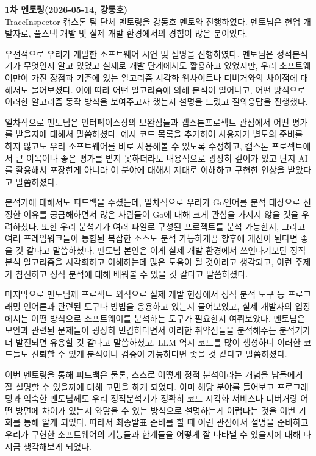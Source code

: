 \documentclass[a4paper,12pt]{article}
\begin{document}





\textbf{\large 1차 멘토링(2026-05-14, 강동호)} ~\\

TraceInspector 캡스톤 팀 단체 멘토링을 강동호 멘토와 진행하였다. 멘토님은 현업 개발자로, 풀스택 개발 및 실제 개발 환경에서의 경험이 많은 분이었다. 

우선적으로 우리가 개발한 소프트웨어 시연 및 설명을 진행하였다. 멘토님은 정적분석기가 무엇인지 알고 있었고 실제로 개발 단계에서도 활용하고 있었지만, 우리 소프트웨어만이 가진 장점과 기존에 있는 알고리즘 시각화 웹사이트나 디버거와의 차이점에 대해서도 물어보셨다. 이에 따라 어떤 알고리즘에 의해 분석이 일어나고, 어떤 방식으로 이러한 알고리즘 동작 방식을 보여주고자 했는지 설명을 드렸고 질의응답을 진행했다.

일차적으로 멘토님은 인터페이스상의 보완점들과 캡스톤프로젝트 관점에서 어떤 평가를 받을지에 대해서 말씀하셨다. 예시 코드 목록을 추가하여 사용자가 별도의 준비를 하지 않고도 우리 소프트웨어를 바로 사용해볼 수 있도록 수정하고, 캡스톤 프로젝트에서 큰 이목이나 좋은 평가를 받지 못하더라도 내용적으로 굉장히 깊이가 있고 단지 AI를 활용해서 포장한게 아니라 이 분야에 대해서 제대로 이해하고 구현한 인상을 받았다고 말씀하셨다. 

분석기에 대해서도 피드백을 주셨는데, 일차적으로 우리가 Go언어를 분석 대상으로 선정한 이유를 궁금해하면서 많은 사람들이 Go에 대해 크게 관심을 가지지 않을 것을 우려하셨다. 또한 우리 분석기가 여러 파일로 구성된 프로젝트를 분석 가능한지, 그리고 여러 프레임워크들이 통합된 복잡한 소스도 분석 가능하게끔 향후에 개선이 된다면 좋을 것 같다고 말씀하셨다. 멘토님 본인은 이게 실제 개발 환경에서 쓰인다기보단 정적 분석 알고리즘을 시각화하고 이해하는데 많은 도움이 될 것이라고 생각되고, 이런 주제가 참신하고 정적 분석에 대해 배워볼 수 있을 것 같다고 말씀하셨다.

마지막으로 멘토님께 프로젝트 외적으로 실제 개발 현장에서 정적 분석 도구 등 프로그래밍 언어론과 관련된 도구나 방법을 응용하고 있는지 물어보았고, 실제 개발자의 입장에서는 어떤 방식으로 소프트웨어를 분석하는 도구가 필요한지 여쭤보았다. 멘토님은 보안과 관련된 문제들이 굉장히 민감하다면서 이러한 취약점들을 분석해주는 분석기가 더 발전되면 유용할 것 같다고 말씀하셨고, LLM 역시 코드를 많이 생성하니 이러한 코드들도 신뢰할 수 있게 분석이나 검증이 가능하다면 좋을 것 같다고 말씀하셨다.

이번 멘토링을 통해 피드백은 물론, 스스로 어떻게 정적 분석이라는 개념을 남들에게 잘 설명할 수 있을까에 대해 고민을 하게 되었다. 이미 해당 분야를 들어보고 프로그래밍과 익숙한 멘토님께도 우리 정적분석기가 정확히 코드 시각화 서비스나 디버거랑 어떤 방면에 차이가 있는지 와닿을 수 있는 방식으로 설명하는게 어렵다는 것을 이번 기회를 통해 알게 되었다. 따라서 최종발표 준비를 할 때 이런 관점에서 설명을 준비하고 우리가 구현한 소프트웨어의 기능들과 한계들을 어떻게 잘 나타낼 수 있을지에 대해 다시금 생각해보게 되었다.
\end{document}
